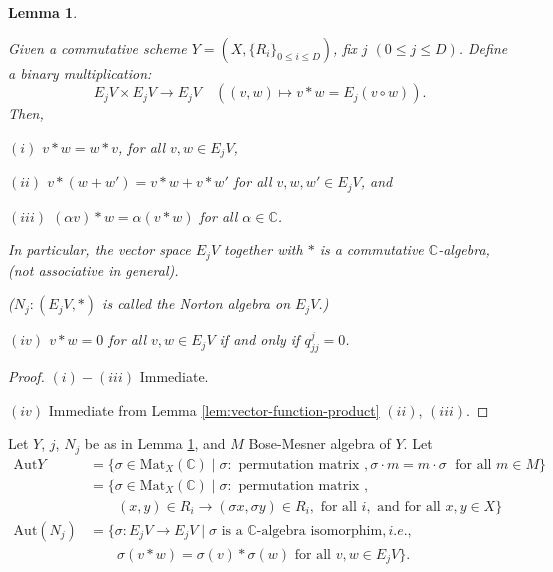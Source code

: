 \documentclass[
]{book}
\newtheorem{lemma}{Lemma}[chapter]
\theoremstyle{definition}
\theoremstyle{definition}
\theoremstyle{definition}
\theoremstyle{definition}
\theoremstyle{remark}
\begin{document}
\begin{lemma}
\protect\hypertarget{lem:norton-algebra}{}\label{lem:norton-algebra}

Given a commutative scheme \(Y = (X, \{R_i\}_{0\leq i\leq D})\), fix \(j\) \((0\leq j\leq D)\).
Define a binary multiplication:
\[E_jV \times E_jV \longrightarrow E_jV \quad ((v,w) \mapsto v\ast w = E_j(v\circ w)).\]
Then,

\((i)\) \(v\ast w = w\ast v\), for all \(v,w\in E_jV\),

\((ii)\) \(v\ast (w + w') = v\ast w + v\ast w'\) for all \(v,w,w'\in E_jV\), and

\((iii)\) \((\alpha v)\ast w = \alpha(v\ast w)\) for all \(\alpha \in \mathbb{C}\).

In particular, the vector space \(E_jV\) together with \(\ast\) is a commutative \(\mathbb{C}\)-algebra, (not associative in general).

(\(N_j: (E_jV, \ast)\) is called the Norton algebra  on \(E_jV\).)

\((iv)\) \(v\ast w = 0\) for all \(v, w\in E_jV\) if and only if \(q^j_{jj} = 0\).

\end{lemma}

\begin{proof}
\leavevmode

\((i)-(iii)\) Immediate.

\((iv)\) Immediate from Lemma \ref{lem:vector-function-product} \((ii)\), \((iii)\).

\end{proof}

Let \(Y\), \(j\), \(N_j\) be as in Lemma \ref{lem:norton-algebra}, and \(M\) Bose-Mesner algebra of \(Y\).
Let
\begin{align}
\mathrm{Aut}Y & = \{\sigma\in \mathrm{Mat}_X(\mathbb{C}) \mid \sigma: \text{ permutation matrix }, \sigma \cdot m = m\cdot \sigma \;\text{ for all }m\in M\}\\
& = \{\sigma\in \mathrm{Mat}_X(\mathbb{C}) \mid \sigma: \text{ permutation matrix },\\
& \qquad (x,y)\in R_i \to (\sigma x, \sigma y)\in R_i, \text{ for all } i, \text{ and for all } x,y\in X\}\\
\mathrm{Aut}(N_j) & = \{\sigma: E_jV \to E_jV \mid \sigma \text{ is a  $\mathbb{C}$-algebra isomorphim},i.e.,\\
& \qquad \sigma(v\ast w) = \sigma(v)\ast\sigma(w) \text{ for all }v, w\in E_jV\}.
\end{align}
\end{document}
